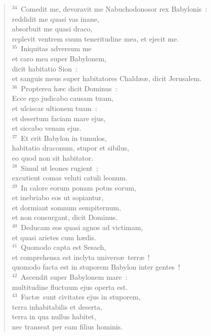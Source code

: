 \begin{verse}
${}^{34}$~Comedit me, devoravit me Nabuchodonosor rex Babylonis~:\\ reddidit me quasi vas inane,\\ absorbuit me quasi draco,\\ replevit ventrem suum teneritudine mea, et ejecit me.\\
${}^{35}$~Iniquitas adversum me\\ et caro mea super Babylonem,\\ dicit habitatio Sion~:\\ et sanguis meus super habitatores Chald\ae \ae , dicit Jerusalem.\\
${}^{36}$~Propterea h\ae c dicit Dominus~:\\ Ecce ego judicabo causam tuam,\\ et ulciscar ultionem tuam~:\\ et desertum faciam mare ejus,\\ et siccabo venam ejus.\\
${}^{37}$~Et erit Babylon in tumulos,\\ habitatio draconum, stupor et sibilus,\\ eo quod non sit habitator.\\
${}^{38}$~Simul ut leones rugient~;\\ excutient comas veluti catuli leonum.\\
${}^{39}$~In calore eorum ponam potus eorum,\\ et inebriabo eos ut sopiantur,\\ et dormiant somnum sempiternum,\\ et non consurgant, dicit Dominus.\\
${}^{40}$~Deducam eos quasi agnos ad victimam,\\ et quasi arietes cum h\ae dis.\\
${}^{41}$~Quomodo capta est Sesach,\\ et comprehensa est inclyta univers\ae\ terr\ae~!\\ quomodo facta est in stuporem Babylon inter gentes~!\\
${}^{42}$~Ascendit super Babylonem mare~:\\ multitudine fluctuum ejus operta est.\\
${}^{43}$~Fact\ae\ sunt civitates ejus in stuporem,\\ terra inhabitabilis et deserta,\\ terra in qua nullus habitet,\\ nec transeat per eam filius hominis.\\

\end{verse}
